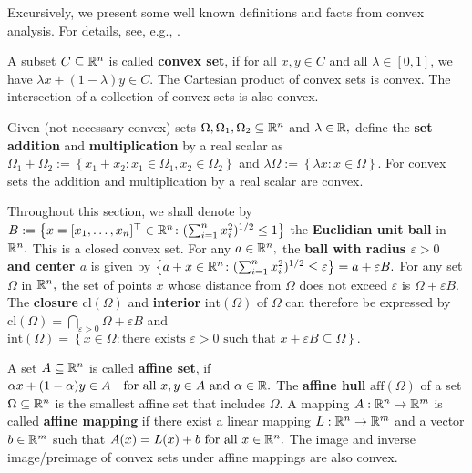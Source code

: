 Excursively, we present some well known definitions and facts from
convex analysis. For details, see, e.g., \cite{Mordukhovich2022}.

A subset $C\subseteq \mathbb{R}^n$ is called \textbf{convex set}, 
if for all $x,y\in C$ and all $\lambda\in [0,1]$,
we have 
$
  \lambda x + (1-\lambda)y 
  \in
  C
  .
$
The Cartesian product of convex sets is convex. The intersection of a collection of convex sets is also convex.




Given (not necessary convex) sets 
$
  \Omega,
  \Omega_1,
  \Omega_2
  \subseteq 
  \mathbb{R}^n
$
and
$\lambda\in\mathbb{R},$
define the \textbf{set addition} and \textbf{multiplication}
by a real scalar as 
$
  \Omega_1 
  +
  \Omega_2 
  :=
  \left\{ 
    x_1 + x_2 
    \colon
    x_1 \in \Omega_1
    ,
    x_2 \in \Omega_2
  \right\}
$
and
$
  \lambda \Omega
  :=
  \left\{ 
    \lambda x
    \colon
    x\in\Omega
  \right\}.
$
For convex sets the addition and multiplication by a real scalar are convex.

Throughout this section, we shall denote by 
$
  B
  :=
  \left\{ 
    x=
    [x_1, \ldots, x_n]^\top
    \in\mathbb{R}^n
    \colon
    (
    \sum_{i=1}^{n} 
    x_i^2
    )
    ^{1/2}
    \le 1
  \right\}
$
the \textbf{Euclidian unit ball} in $\mathbb{R}^n.$
This is a closed convex set. For any $a\in\mathbb{R}^n,$ 
the \textbf{ball with radius $\varepsilon >0$ and center $a$}
is given by
$
  \left\{ 
   a+x 
    \in\mathbb{R}^n
    \colon
    (
    \sum_{i=1}^{n} 
    x_i^2
    )
    ^{1/2}
    \le \varepsilon
  \right\}
  =
  a
  +
  \varepsilon B
  .
$
For any set $\Omega$ in $\mathbb{R}^n,$ 
the set of points $x$ whose distance from $\Omega$
does not exceed $\varepsilon$ is 
$
\Omega + \varepsilon B.
$
The \textbf{closure} $\mathrm{cl}(\Omega)$
and \textbf{interior} $\mathrm{int}(\Omega)$
of $\Omega$
can therefore be expressed by 
$
  \mathrm{cl}(\Omega)
  =
  \bigcap_{\varepsilon>0}
  \Omega + \varepsilon B
$
and
$
  \mathrm{int}(\Omega)
  =
  \left\{ 
    x\in \Omega
    \colon
    \text{there exists $\varepsilon>0$ such that }
    x+\varepsilon B
    \subseteq
    \Omega
  \right\}
  .
$

  A set 
  $A\subseteq \mathbb{R}^n$
  is called \textbf{affine set}, if
  $
    \alpha x + (1-\alpha)y \in A
    \quad
    \text{for all}
    \ 
    x,y \in A
    \ 
    \text{and}
    \ 
    \alpha \in \R.
  $
  The \textbf{affine hull} 
  $\mathrm{aff}(\Omega)$
  of a set 
  $\Omega\subseteq \mathbb{R}^n$
  is the smallest affine set that includes $\Omega.$
A mapping 
$
  A: \mathbb{R}^n \to \mathbb{R}^m
$
is called \textbf{affine mapping} if there exist a linear mapping
$
  L: \mathbb{R}^n \to \mathbb{R}^m
$
and a vector $b\in \mathbb{R}^m$
such that
$
  A(x)
  =
  L(x)
  +
  b
  \ 
  \text{for all}\ 
  x \in \R^n
  .
$
The image and inverse image/preimage of convex sets under affine mappings are also convex.





